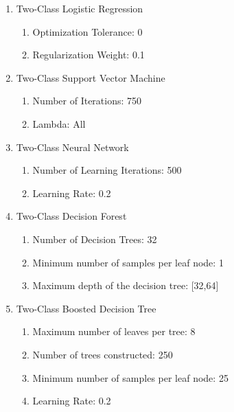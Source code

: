 \begin{enumerate}
    \item{Two-Class Logistic Regression}
    
    \begin{enumerate}
        \item{Optimization Tolerance:} 0
        \item{Regularization Weight:} 0.1
    \end{enumerate}
    
    \item{Two-Class Support Vector Machine}
    
    \begin{enumerate}
        \item{Number of Iterations:} 750
        \item{Lambda:} All
    \end{enumerate}
    
    \item{Two-Class Neural Network}
    
    \begin{enumerate}
        \item{Number of Learning Iterations:} 500
        \item{Learning Rate:} 0.2
    \end{enumerate}
    
    \item{Two-Class Decision Forest}

    \begin{enumerate}
        \item{Number of Decision Trees:} 32
        \item{Minimum number of samples per leaf node:} 1
        \item{Maximum depth of the decision tree:} [32,64]
    \end{enumerate}

    \item{Two-Class Boosted Decision Tree}
    
    \begin{enumerate}
        \item{Maximum number of leaves per tree:} 8
        \item{Number of trees constructed:} 250
        \item{Minimum number of samples per leaf node:} 25
        \item{Learning Rate:} 0.2
    \end{enumerate}
    
\end{enumerate}


